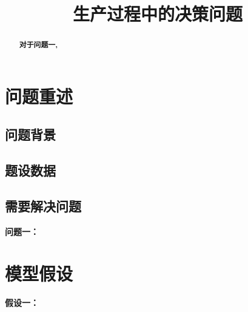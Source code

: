 \documentclass[withoutpreface,bwprint]{cumcmthesis}
\title{生产过程中的决策问题}
\begin{document}
\maketitle
\thispagestyle{empty}
\begin{abstract}



\textbf{对于问题一,}


   \keywords{} 

\end{abstract}


\section{问题重述}

\subsection{问题背景}



\subsection{题设数据}






\subsection{需要解决问题}

\textbf{问题一：}



\section{模型假设}
\textbf{假设一：}





\newpage
\end{document}
